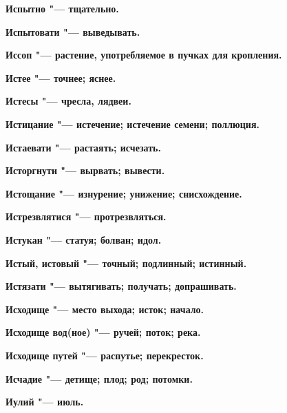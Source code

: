 \bfseries Испытно \normalfont{} "--- тщательно. 




\bfseries Испытовати \normalfont{} "--- выведывать. 




\bfseries Иссоп \normalfont{} "--- растение, употребляемое в пучках для кропления. 




\bfseries Истее \normalfont{} "--- точнее; яснее. 




\bfseries Истесы \normalfont{} "--- чресла, лядвеи. 




\bfseries Истицание \normalfont{} "--- истечение; истечение семени; поллюция. 




\bfseries Истаевати \normalfont{} "--- растаять; исчезать. 




\bfseries Исторгнути \normalfont{} "--- вырвать; вывести. 




\bfseries Истощание \normalfont{} "--- изнурение; унижение; снисхождение. 




\bfseries Истрезвлятися \normalfont{} "--- протрезвляться. 




\bfseries Истукан \normalfont{} "--- статуя; болван; идол. 




\bfseries Истый, истовый \normalfont{} "--- точный; подлинный; истинный. 




\bfseries Истязати \normalfont{} "--- вытягивать; получать; допрашивать. 




\bfseries Исходище \normalfont{} "--- место выхода; исток; начало. 




\bfseries Исходище вод(ное) \normalfont{} "--- ручей; поток; река. 




\bfseries Исходище путей \normalfont{} "--- распутье; перекресток. 




\bfseries Исчадие \normalfont{} "--- детище; плод; род; потомки. 




\bfseries Иулий \normalfont{} "--- июль. 




